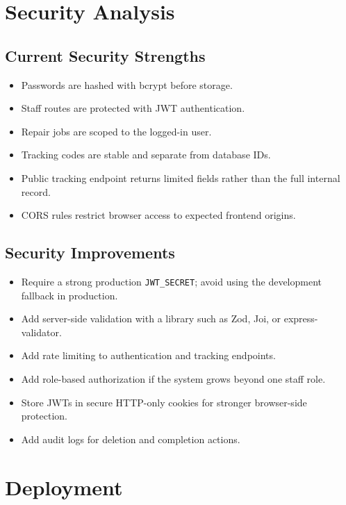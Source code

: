 \documentclass[12pt,a4paper]{report}
\begin{document}
\chapter{Security Analysis}

\section{Current Security Strengths}

\begin{itemize}
  \item Passwords are hashed with bcrypt before storage.
  \item Staff routes are protected with JWT authentication.
  \item Repair jobs are scoped to the logged-in user.
  \item Tracking codes are stable and separate from database IDs.
  \item Public tracking endpoint returns limited fields rather than the full internal record.
  \item CORS rules restrict browser access to expected frontend origins.
\end{itemize}

\section{Security Improvements}

\begin{itemize}
  \item Require a strong production \texttt{JWT\_SECRET}; avoid using the development fallback in production.
  \item Add server-side validation with a library such as Zod, Joi, or express-validator.
  \item Add rate limiting to authentication and tracking endpoints.
  \item Add role-based authorization if the system grows beyond one staff role.
  \item Store JWTs in secure HTTP-only cookies for stronger browser-side protection.
  \item Add audit logs for deletion and completion actions.
\end{itemize}

\chapter{Deployment}
\end{document}

